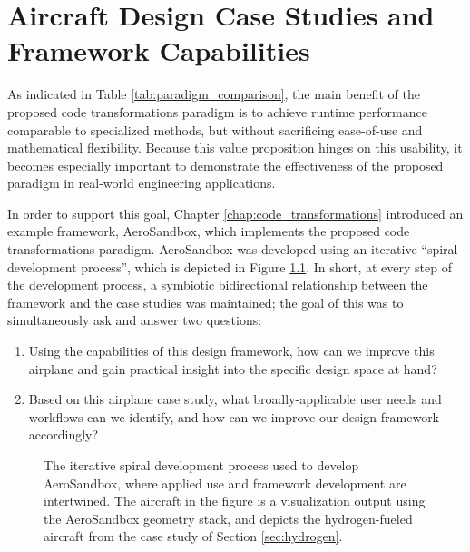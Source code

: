\chapter{Aircraft Design Case Studies and Framework Capabilities}
\label{chap:design-studies}

As indicated in Table \ref{tab:paradigm_comparison}, the main benefit of the proposed code transformations paradigm is to achieve runtime performance comparable to specialized methods, but without sacrificing ease-of-use and mathematical flexibility. Because this value proposition hinges on this usability, it becomes especially important to demonstrate the effectiveness of the proposed paradigm in real-world engineering applications.

In order to support this goal, Chapter \ref{chap:code_transformations} introduced an example framework, AeroSandbox, which implements the proposed code transformations paradigm. AeroSandbox was developed using an iterative ``spiral development process'', which is depicted in Figure \ref{fig:spiral}. In short, at every step of the development process, a symbiotic bidirectional relationship between the framework and the case studies was maintained; the goal of this was to simultaneously ask and answer two questions:

\begin{enumerate}[noitemsep]
    \item Using the capabilities of this design framework, how can we improve this airplane and gain practical insight into the specific design space at hand?
    \item Based on this airplane case study, what broadly-applicable user needs and workflows can we identify, and how can we improve our design framework accordingly?
\end{enumerate}

\begin{figure}[H]
    \centering
    
    \caption{The iterative spiral development process used to develop AeroSandbox, where applied use and framework development are intertwined. The aircraft in the figure is a visualization output using the AeroSandbox geometry stack, and depicts the hydrogen-fueled aircraft from the case study of Section \ref{sec:hydrogen}.}
    \label{fig:spiral}
\end{figure}

